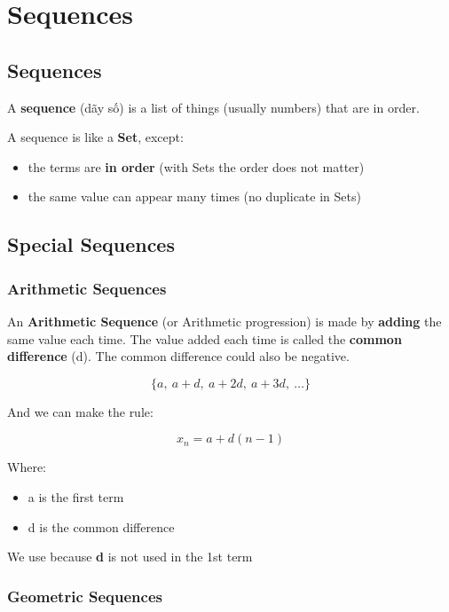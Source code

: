 \chapter{Sequences}

\section{Sequences}

A \textbf{sequence} (dãy số) is a list of things (usually numbers) that are in order.

A sequence is like a \textbf{Set}, except:

\begin{itemize}
  \item the terms are \textbf{in order} (with Sets the order does not matter)
  \item the same value can appear many times (no duplicate in Sets)
\end{itemize}

\section{Special Sequences}

\subsection{Arithmetic Sequences}

An \textbf{Arithmetic Sequence} (or Arithmetic progression) is made by \textbf{adding} the same value each time. The value added each time is called the \textbf{common difference} (d). The common difference could also be negative.

\[\{a,\ a+d,\ a+2d,\ a+3d,\ \ldots\}\]

And we can make the rule:

\[x_{n}=a+d(n-1)\]

Where:

\begin{itemize}
  \item a is the first term
  \item d is the common difference
\end{itemize}

We use  because \textbf{d} is not used in the 1st term

\subsection{Geometric Sequences}

